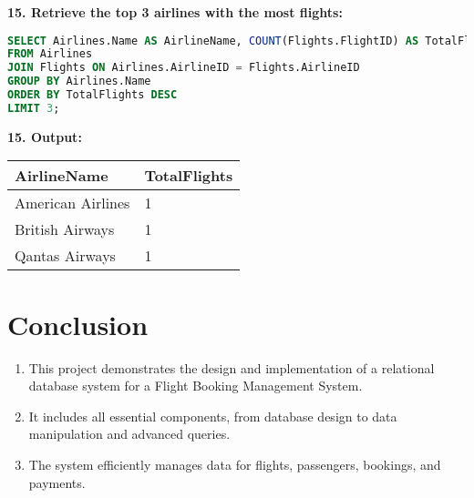 \documentclass[14pt,a4paper]{extarticle}
\begin{document}
\newpage

    \textbf{15. Retrieve the top 3 airlines with the most flights:}
    \begin{lstlisting}[language=SQL, upquote=true]
SELECT Airlines.Name AS AirlineName, COUNT(Flights.FlightID) AS TotalFlights
FROM Airlines
JOIN Flights ON Airlines.AirlineID = Flights.AirlineID
GROUP BY Airlines.Name
ORDER BY TotalFlights DESC
LIMIT 3;
    \end{lstlisting}
    
    \textbf{15. Output:}
\begin{table}[h!]
\centering
\begin{tabular}{|l|l|}
\hline
\textbf{AirlineName}     & \textbf{TotalFlights} \\ \hline
American Airlines        & 1                     \\ \hline
British Airways          & 1                     \\ \hline
Qantas Airways           & 1                     \\ \hline
\end{tabular}
\end{table}

\newpage

\section{Conclusion}

\begin{enumerate}
    \item This project demonstrates the design and implementation of a relational database system for a Flight Booking Management System.
    \item It includes all essential components, from database design to data manipulation and advanced queries.
    \item The system efficiently manages data for flights, passengers, bookings, and payments.
\end{enumerate}
\end{document}
